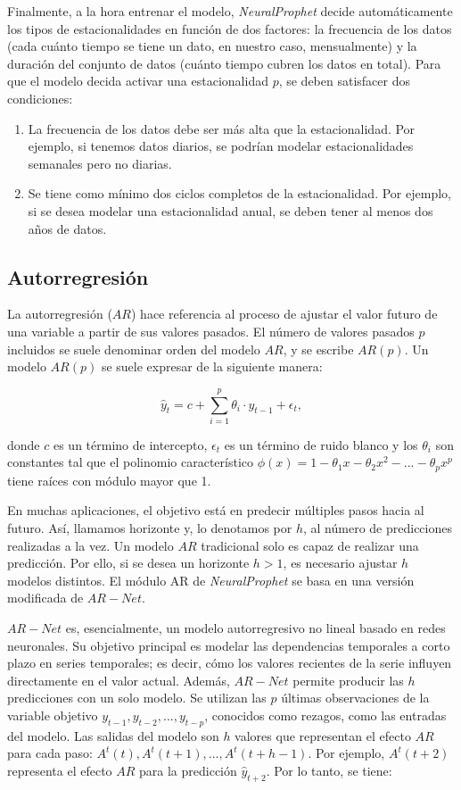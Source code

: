 \documentclass[12pt,twoside]{article}
\begin{document}
Finalmente, a la hora entrenar el modelo, \textit{NeuralProphet} decide automáticamente los tipos de estacionalidades en función de dos factores: la frecuencia de los datos (cada cuánto tiempo se tiene un dato, en nuestro caso, mensualmente) y la duración del conjunto de datos (cuánto tiempo cubren los datos en total). Para que el modelo decida activar una estacionalidad $p$, se deben satisfacer dos condiciones:

\begin{enumerate}
    \item La frecuencia de los datos debe ser más alta que la estacionalidad. Por ejemplo, si tenemos datos diarios, se podrían modelar estacionalidades semanales pero no diarias.
    \item Se tiene como mínimo dos ciclos completos de la estacionalidad. Por ejemplo, si se desea modelar una estacionalidad anual, se deben tener al menos dos años de datos.
\end{enumerate}

\subsection{Autorregresión}\label{sec:24}

La autorregresión ($AR$) hace referencia al proceso de ajustar el valor futuro de una variable a partir de sus valores pasados. El número de valores pasados $p$ incluidos se suele denominar orden del modelo $AR$, y se escribe $AR(p)$. Un modelo $AR(p)$ se suele expresar de la siguiente manera:

\begin{equation}
\hat{y}_t = c + \sum_{i=1}^p \theta_i \cdot y_{t-1}+ \epsilon_t,
\end{equation}

donde $c$ es un término de intercepto, $\epsilon_t$ es un término de ruido blanco y los $\theta_i$ son constantes tal que el polinomio característico $\phi (x)=1-\theta_1x-\theta_2x^2-...-\theta_px^p$ tiene raíces con módulo mayor que 1.

En muchas aplicaciones, el objetivo está en predecir múltiples pasos hacia al futuro. Así, llamamos horizonte y, lo denotamos por $h$, al número de predicciones realizadas a la vez. Un modelo $AR$ tradicional solo es capaz de realizar una predicción. Por ello, si se desea un horizonte $h>1$, es necesario ajustar $h$ modelos distintos. El módulo AR de \textit{NeuralProphet} se basa en una versión modificada de $AR-Net$.

$AR-Net$ es, esencialmente, un modelo autorregresivo no lineal basado en redes neuronales. Su objetivo principal es modelar las dependencias temporales a corto plazo en series temporales; es decir, cómo los valores recientes de la serie influyen directamente en el valor actual. Además, $AR-Net$ permite producir las $h$ predicciones con un solo modelo. Se utilizan las $p$ últimas observaciones de la variable objetivo $y_{t-1},y_{t-2},...,y_{t-p}$, conocidos como rezagos, como las entradas del modelo. Las salidas del modelo son $h$ valores que representan el efecto $AR$ para cada paso: $A^t(t),A^t(t+1),...,A^t(t+h-1)$. Por ejemplo, $A^t(t+2)$ representa el efecto $AR$ para la predicción $\hat{y}_{t+2}$. Por lo tanto, se tiene:
\end{document}
